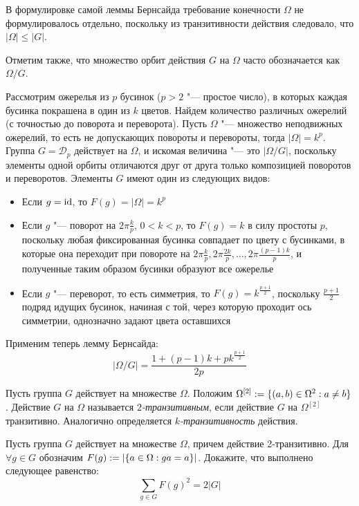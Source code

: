 \begin{note}
	В формулировке самой леммы Бернсайда требование конечности $\Omega$ не формулировалось отдельно, поскольку из транзитивности действия следовало, что $|\Omega| \le |G|$.
	
	Отметим также, что множество орбит действия $G$ на $\Omega$ часто обозначается как $\Omega / G$.
\end{note}

\begin{example}
	Рассмотрим ожерелья из $p$ бусинок ($p > 2$ "--- простое число), в которых каждая бусинка покрашена в один из $k$ цветов. Найдем количество различных ожерелий (с точностью до поворота и переворота). Пусть $\Omega$ "--- множество неподвижных ожерелий, то есть не допускающих повороты и перевороты, тогда $|\Omega| = k^p$. Группа $G = \mathcal{D}_p$ действует на $\Omega$, и искомая величина "--- это $|\Omega / G|$, поскольку элементы одной орбиты отличаются друг от друга только композицией поворотов и переворотов. Элементы $G$ имеют один из следующих видов:
	\begin{itemize}
		\item Если $g = \operatorname{id}$, то $F(g) = |\Omega| = k^p$
		\item Если $g$ "--- поворот на $2\pi\frac kp$, $0 < k < p$, то $F(g) = k$ в силу простоты $p$, поскольку любая фиксированная бусинка совпадает по цвету с бусинками, в которые она переходит при повороте на $2\pi\frac kp, 2\pi\frac {2k}p, \dotsc, 2\pi\frac {(p-1)k}p$, и полученные таким образом бусинки образуют все ожерелье
		\item Если $g$ "--- переворот, то есть симметрия, то $F(g) = k^{\frac{p+1}2}$, поскольку ${\frac{p+1}2}$ подряд идущих бусинок, начиная с той, через которую проходит ось симметрии, однозначно задают цвета оставшихся
	\end{itemize}
	
	Применим теперь лемму Бернсайда:
	\[|\Omega / G| = \frac{1 + (p-1)k + pk^{\frac{p+1}2}}{2p}\]
\end{example}

\begin{definition}
	Пусть группа $G$ действует на множестве $\Omega$. Положим $\Omega^{[2]} := \{(a, b) \hm\in \Omega^2: a \ne b\}$. Действие $G$ на $\Omega$ называется \textit{$2$-транзитивным}, если действие $G$ на $\Omega^{[2]}$ транзитивно. Аналогично определяется \textit{$k$-транзитивность} действия.
\end{definition}

\begin{exercise}
	Пусть группа $G$ действует на множестве $\Omega$, причем действие 2\nobreakdash-транзитивно. Для $\forall g \in G$ обозначим $F(g) := |\{a \hm\in \Omega: ga = a\}|$. Докажите, что выполнено следующее равенство:
	\[\sum\limits_{g \in G}F(g)^2 = 2|G|\]
\end{exercise}

